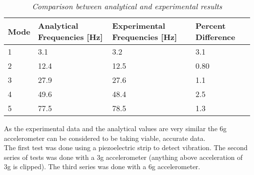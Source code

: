 \begin{table}
\begin{center}
    \begin{tabular}{|l|l|l|l|}
    \hline
    Mode & Analytical Frequencies [Hz] & Experimental Frequencies [Hz] & Percent Difference \\
    \hline
    1    & 3.1                         & 3.2                           & 3.1                \\
    2    & 12.4                        & 12.5                          & 0.80               \\
    3    & 27.9                        & 27.6                          & 1.1                \\
    4    & 49.6                        & 48.4                          & 2.5                \\
    5    & 77.5                        & 78.5                          & 1.3                \\
    \hline
    \end{tabular}
    \caption{\textit{Comparison between analytical and experimental results}}
    \label{tab:ExperimentalvsAnalytical}
\end{center}
\end{table}

As the experimental data and the analytical values are very similar the 6g accelerometer can be considered to be taking viable, accurate data.\\



The first test was done using a piezoelectric strip to detect vibration. The second series of tests was done with a 3g accelerometer (anything above acceleration of 3g is clipped). The third series was done with a 6g accelerometer.
